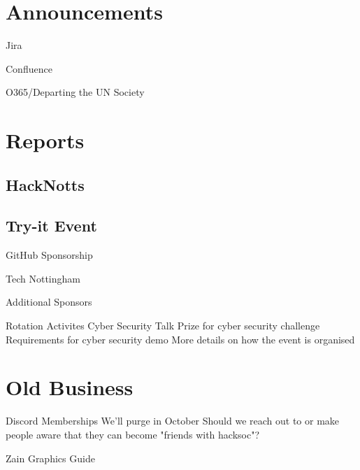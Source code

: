 \documentclass[11pt,hacksoc,agenda]{meetingmins}
\begin{document}
\maketitle

\section{Announcements}
\begin{items}
	\item Jira
	\item Confluence
	\item O365/Departing the UN Society
\end{items}

\section{Reports}

\subsection{HackNotts}
\begin{items}
	\item
\end{items}

\subsection{Try-it Event}
\begin{items}
	\item GitHub Sponsorship
	\item Tech Nottingham
	\item Additional Sponsors
	\item Rotation Activites
		\subitem Cyber Security Talk
			\subsubitem Prize for cyber security challenge
			\subsubitem Requirements for cyber security demo
			\subsubitem More details on how the event is organised
\end{items}

\section{Old Business}
\begin{items}
	\item Discord Memberships
		\subitem We'll purge in October
		\subitem Should we reach out to or make people aware that they can become "friends with hacksoc"?
	\item Zain Graphics Guide
\end{items}
\end{document}
